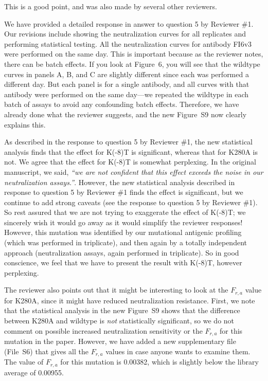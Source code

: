 \documentclass[11pt, oneside]{article}   	%
\begin{document}
{\color{black}
This is a good point, and was also made by several other reviewers.

We have provided a detailed response in answer to question 5 by Reviewer \#1.
Our revisions include showing the neutralization curves for all replicates and performing statistical testing.
All the neutralization curves for antibody FI6v3 were performed on the same day.
This is important because as the reviewer notes, there can be batch effects.
If you look at Figure~6, you will see that the wildtype curves in panels A, B, and C are slightly different since each was performed a different day.
But each panel is for a single antibody, and all curves with that antibody were performed on the same day---we repeated the wildtype in each batch of assays to avoid any confounding batch effects.
Therefore, we have already done what the reviewer suggests, and the new Figure~S9 now clearly explains this.

As described in the response to question 5 by Reviewer \#1, the new statistical analysis finds that the effect for K(-8)T is significant, whereas that for K280A is not.
We agree that the effect for K(-8)T is somewhat perplexing.
In the original manuscript, we said, \textsl{``we are not confident that this effect exceeds the noise in our neutralization assays.''}.
However, the new statistical analysis described in response to question 5 by Reviewer \#1 finds the effect is significant, but we continue to add strong caveats (see the response to question 5 by Reviewer \#1). 
So rest assured that we are not trying to exaggerate the effect of K(-8)T; we sincerely wish it would go away as it would simplify the reviewer responses!
However, this mutation was identified by our mutational antigenic profiling (which was performed in triplicate), and then again by a totally independent approach (neutralization assays, again performed in triplicate). 
So in good conscience, we feel that we have to present the result with K(-8)T, however perplexing.

The reviewer also points out that it might be interesting to look at the $F_{r,a}$ value for K280A, since it might have reduced neutralization resistance.
First, we note that the statistical analysis in the new Figure~S9 shows that the difference between K280A and wildtype is \emph{not} statistically significant, so we do not comment on possible increased neutralization sensitivity or the $F_{r,a}$ for this mutation in the paper.
However, we have added a new supplementary file (File~S6) that gives all the $F_{r,a}$ values in case anyone wants to examine them.
The value of $F_{r,a}$ for this mutation is 0.00382, which is slightly below the library average of 0.00955.
}
\end{document}
